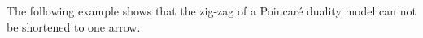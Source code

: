 \documentclass[\MainFolder/Text.tex]{subfiles}
\begin{document}

The following example shows that the zig-zag of a Poincar\'e duality model can not be shortened to one arrow.
\end{document}
